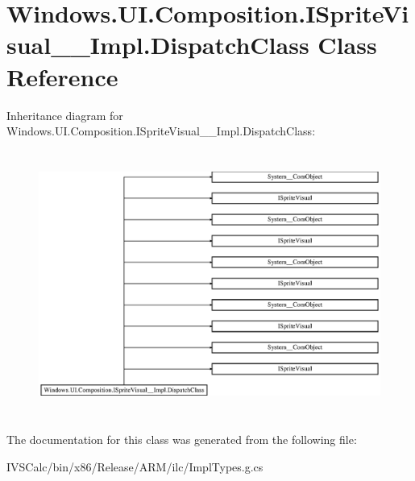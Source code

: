 \hypertarget{class_windows_1_1_u_i_1_1_composition_1_1_i_sprite_visual_____impl_1_1_dispatch_class}{}\section{Windows.\+U\+I.\+Composition.\+I\+Sprite\+Visual\+\_\+\+\_\+\+Impl.\+Dispatch\+Class Class Reference}
\label{class_windows_1_1_u_i_1_1_composition_1_1_i_sprite_visual_____impl_1_1_dispatch_class}
Inheritance diagram for Windows.\+U\+I.\+Composition.\+I\+Sprite\+Visual\+\_\+\+\_\+\+Impl.\+Dispatch\+Class\+:\begin{figure}[H]
\begin{center}
\leavevmode
\includegraphics[height=8.750000cm]{class_windows_1_1_u_i_1_1_composition_1_1_i_sprite_visual_____impl_1_1_dispatch_class}
\end{center}
\end{figure}


The documentation for this class was generated from the following file\+:\begin{DoxyCompactItemize}
\item 
I\+V\+S\+Calc/bin/x86/\+Release/\+A\+R\+M/ilc/Impl\+Types.\+g.\+cs\end{DoxyCompactItemize}
